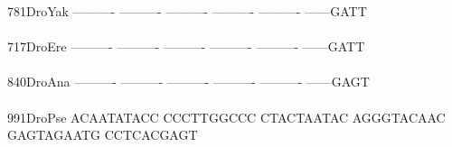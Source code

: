 \documentclass[11pt,twoside,reqno,a4paper]{article}
\begin{document}
{781\hspace*{2\charwidth}DroYak	----------	----------	----------	----------	----------	------GATT	\\
\hspace*{5\charwidth}\hspace*{7\charwidth}\hspace*{1\charwidth}\hspace*{1\charwidth}\hspace*{1\charwidth}\hspace*{1\charwidth}\hspace*{1\charwidth}\hspace*{1\charwidth}\\
717\hspace*{2\charwidth}DroEre	----------	----------	----------	----------	----------	------GATT	\\
\hspace*{5\charwidth}\hspace*{7\charwidth}\hspace*{1\charwidth}\hspace*{1\charwidth}\hspace*{1\charwidth}\hspace*{1\charwidth}\hspace*{1\charwidth}\hspace*{1\charwidth}\\
840\hspace*{2\charwidth}DroAna	----------	----------	----------	----------	----------	------GAGT	\\
\hspace*{5\charwidth}\hspace*{7\charwidth}\hspace*{1\charwidth}\hspace*{1\charwidth}\hspace*{1\charwidth}\hspace*{1\charwidth}\hspace*{1\charwidth}\hspace*{1\charwidth}\\
991\hspace*{2\charwidth}DroPse	ACAATATACC	CCCTTGGCCC	CTACTAATAC	AGGGTACAAC	GAGTAGAATG	CCTCACGAGT	\\
\hspace*{5\charwidth}\hspace*{7\charwidth}\hspace*{1\charwidth}\hspace*{1\charwidth}\hspace*{1\charwidth}\hspace*{1\charwidth}\hspace*{1\charwidth}\hspace*{1\charwidth}\\
}
\end{document}
